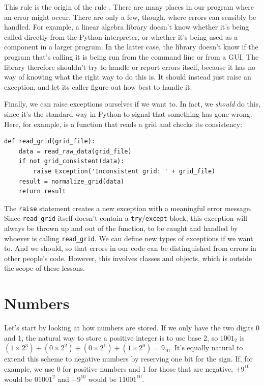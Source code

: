 \documentclass{book}
\begin{document}
This rule is the origin of the rule
. There
are many places in our program where an error might occur. There are
only a few, though, where errors can sensibly be handled. For example, a
linear algebra library doesn't know whether it's being called directly
from the Python interpreter, or whether it's being used as a component
in a larger program. In the latter case, the library doesn't know if the
program that's calling it is being run from the command line or from a
GUI. The library therefore shouldn't try to handle or report errors
itself, because it has no way of knowing what the right way to do this
is. It should instead just raise an exception, and let its caller figure
out how best to handle it.

Finally, we can raise exceptions ourselves if we want to. In fact, we
\emph{should} do this, since it's the standard way in Python to signal
that something has gone wrong. Here, for example, is a function that
reads a grid and checks its consistency:

\begin{verbatim}
def read_grid(grid_file):
    data = read_raw_data(grid_file)
    if not grid_consistent(data):
        raise Exception('Inconsistent grid: ' + grid_file)
    result = normalize_grid(data)
    return result
\end{verbatim}

The \texttt{raise} statement creates a new exception with a meaningful
error message. Since \texttt{read\_grid} itself doesn't contain a
\texttt{try}/\texttt{except} block, this exception will always be thrown
up and out of the function, to be caught and handled by whoever is
calling \texttt{read\_grid}. We can define new types of exceptions if we
want to. And we should, so that errors in our code can be distinguished
from errors in other people's code. However, this involves classes and
objects, which is outside the scope of these lessons.

\section{Numbers}

Let's start by looking at how numbers are stored. If we only have the
two digits 0 and 1, the natural way to store a positive integer is to
use base 2, so $1001_{2}$ is
$(1×2^{3})+(0×2^{2})+(0×2^{1})+(1×2^{0}) = 9_{10}$.
It's equally natural to extend this scheme to
negative numbers by reserving one bit for the sign. If, for example, we
use 0 for positive numbers and 1 for those that are negative,
$+9^{10}$ would be $01001^{2}$ and
$-9^{10}$ would be $11001^{10}$.
\end{document}
